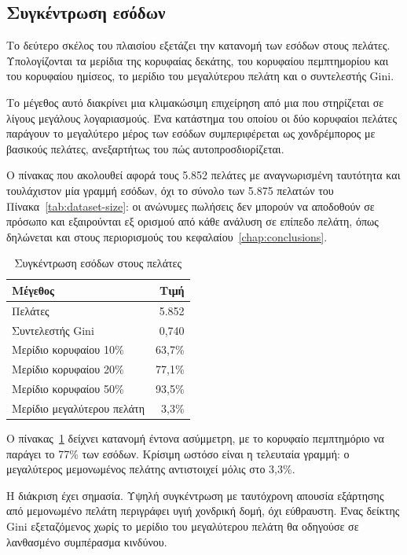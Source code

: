 \subsection{Συγκέντρωση εσόδων}

Το δεύτερο σκέλος του πλαισίου εξετάζει την κατανομή των εσόδων στους
πελάτες. Υπολογίζονται τα μερίδια της κορυφαίας δεκάτης, του κορυφαίου
πεμπτημορίου και του κορυφαίου ημίσεος, το μερίδιο του μεγαλύτερου πελάτη και
ο συντελεστής Gini.

Το μέγεθος αυτό διακρίνει μια κλιμακώσιμη επιχείρηση από μια που στηρίζεται σε
λίγους μεγάλους λογαριασμούς. Ένα κατάστημα του οποίου οι δύο κορυφαίοι
πελάτες παράγουν το μεγαλύτερο μέρος των εσόδων συμπεριφέρεται ως χονδρέμπορος
με βασικούς πελάτες, ανεξαρτήτως του πώς αυτοπροσδιορίζεται.

Ο πίνακας που ακολουθεί αφορά τους 5.852 πελάτες με αναγνωρισμένη ταυτότητα και
τουλάχιστον μία γραμμή εσόδων, όχι το σύνολο των 5.875 πελατών του
Πίνακα~\ref{tab:dataset-size}: οι ανώνυμες πωλήσεις δεν μπορούν να αποδοθούν σε
πρόσωπο και εξαιρούνται εξ ορισμού από κάθε ανάλυση σε επίπεδο πελάτη, όπως
δηλώνεται και στους περιορισμούς του κεφαλαίου~\ref{chap:conclusions}.

\begin{table}[H]
\centering
\caption{Συγκέντρωση εσόδων στους πελάτες}
\label{tab:concentration}
\begin{tabular}{lr}
\toprule
Μέγεθος & Τιμή \\
\midrule
Πελάτες & 5.852 \\
Συντελεστής Gini & 0,740 \\
Μερίδιο κορυφαίου 10\% & 63,7\% \\
Μερίδιο κορυφαίου 20\% & 77,1\% \\
Μερίδιο κορυφαίου 50\% & 93,5\% \\
Μερίδιο μεγαλύτερου πελάτη & 3,3\% \\
\bottomrule
\end{tabular}
\end{table}

Ο πίνακας~\ref{tab:concentration} δείχνει κατανομή έντονα ασύμμετρη, με το
κορυφαίο πεμπτημόριο να παράγει το
77\% των εσόδων. Κρίσιμη ωστόσο είναι η τελευταία γραμμή: ο μεγαλύτερος
μεμονωμένος πελάτης αντιστοιχεί μόλις στο 3,3\%.

Η διάκριση έχει σημασία. Υψηλή συγκέντρωση με ταυτόχρονη απουσία εξάρτησης από
μεμονωμένο πελάτη περιγράφει υγιή χονδρική δομή, όχι εύθραυστη. Ένας δείκτης
Gini \cite{gini1912} εξεταζόμενος χωρίς το μερίδιο του μεγαλύτερου πελάτη
θα οδηγούσε σε λανθασμένο συμπέρασμα κινδύνου.


